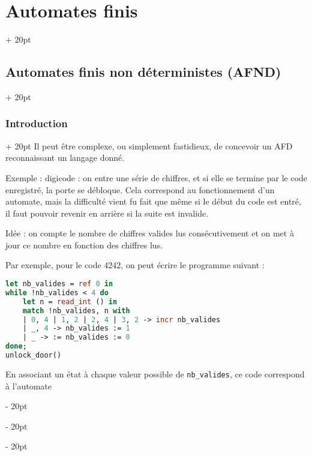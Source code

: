 \documentclass[a4paper, 12pt, twoside]{article}
\newcommand{\ind}[1][20pt]{\advance\leftskip + #1}
\newcommand{\deind}[1][20pt]{\advance\leftskip - #1}
\newenvironment{indt}[2][20pt]{#2 \par \ind[#1]}{\par \deind} %
\begin{document}
\begin{indt}{\section{Automates finis}}
        \vspace{12pt}
        
        \begin{indt}{\subsection{Automates finis non déterministes (AFND)}}
            \begin{indt}{\subsubsection{Introduction}}
                Il peut être complexe, ou simplement fastidieux, de concevoir un AFD reconnaissant un langage donné.

                \vspace{12pt}
                
                Exemple : digicode : on entre une série de chiffres, et si elle se termine par le code enregistré, la porte se débloque.
                Cela correspond au fonctionnement d'un automate, mais la difficulté vient fu fait que même si le début du code est entré, il faut pouvoir revenir en arrière si la suite est invalide.

                Idée : on compte le nombre de chiffres valides lus consécutivement et on met à jour ce nombre en fonction des chiffres lus.

                Par exemple, pour le code 4242, on peut écrire le programme suivant :

                \begin{lstlisting}[language=Caml, xleftmargin=80pt]
let nb_valides = ref 0 in
while !nb_valides < 4 do
    let n = read_int () in
    match !nb_valides, n with
    | 0, 4 | 1, 2 | 2, 4 | 3, 2 -> incr nb_valides
    | _, 4 -> nb_valides := 1
    | _ -> := nb_valides := 0
done;
unlock_door()\end{lstlisting}
                
                En associant un état à chaque valeur possible de \texttt{nb\_valides}, ce code correspond à l'automate

                \begin{center}
\end{center}
\end{indt}
\end{indt}
\end{indt}
\end{document}

